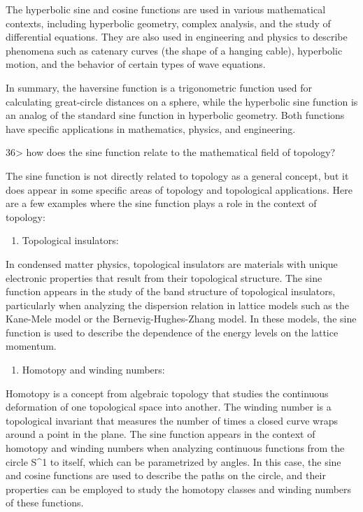 \documentclass[
]{article}
\providecommand{\tightlist}{%
  \setlength{\itemsep}{0pt}\setlength{\parskip}{0pt}}
\begin{document}
The hyperbolic sine and cosine functions are used in various
mathematical contexts, including hyperbolic geometry, complex analysis,
and the study of differential equations. They are also used in
engineering and physics to describe phenomena such as catenary curves
(the shape of a hanging cable), hyperbolic motion, and the behavior of
certain types of wave equations.

In summary, the haversine function is a trigonometric function used for
calculating great-circle distances on a sphere, while the hyperbolic
sine function is an analog of the standard sine function in hyperbolic
geometry. Both functions have specific applications in mathematics,
physics, and engineering.

36\textgreater{} how does the sine function relate to the mathematical
field of topology?

The sine function is not directly related to topology as a general
concept, but it does appear in some specific areas of topology and
topological applications. Here are a few examples where the sine
function plays a role in the context of topology:

\begin{enumerate}
\def\labelenumi{\arabic{enumi}.}
\tightlist
\item
  Topological insulators:
\end{enumerate}

In condensed matter physics, topological insulators are materials with
unique electronic properties that result from their topological
structure. The sine function appears in the study of the band structure
of topological insulators, particularly when analyzing the dispersion
relation in lattice models such as the Kane-Mele model or the
Bernevig-Hughes-Zhang model. In these models, the sine function is used
to describe the dependence of the energy levels on the lattice momentum.

\begin{enumerate}
\def\labelenumi{\arabic{enumi}.}
\setcounter{enumi}{1}
\tightlist
\item
  Homotopy and winding numbers:
\end{enumerate}

Homotopy is a concept from algebraic topology that studies the
continuous deformation of one topological space into another. The
winding number is a topological invariant that measures the number of
times a closed curve wraps around a point in the plane. The sine
function appears in the context of homotopy and winding numbers when
analyzing continuous functions from the circle S\^{}1 to itself, which
can be parametrized by angles. In this case, the sine and cosine
functions are used to describe the paths on the circle, and their
properties can be employed to study the homotopy classes and winding
numbers of these functions.
\end{document}
